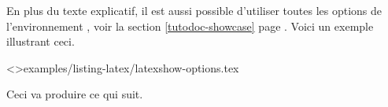 \documentclass{tutodoc}
\begin{document}
\begin{tdocexa}
    En plus du texte explicatif, il est aussi possible d'utiliser toutes les options de l'environnement , voir la section \ref{tutodoc-showcase} page \pageref{tutodoc-showcase}.
    Voici un exemple illustrant ceci.

    \medskip

    \tdoclatexinput<>{examples/listing-latex/latexshow-options.tex}

    \smallskip

    Ceci va produire ce qui suit.

    \smallskip

    
\end{tdocexa}
\end{document}
